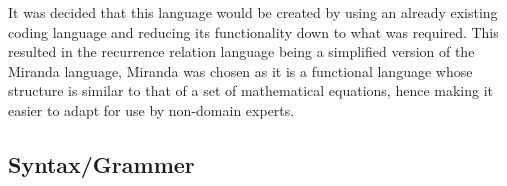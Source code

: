 \documentclass{article}
\begin{document}
It was decided that this language would be created by using an already existing coding language and reducing its functionality down to what was required. This resulted in the recurrence relation language being a simplified version of the Miranda language, Miranda was chosen as it is a functional language whose structure is similar to that of a set of mathematical equations, hence making it easier to adapt for use by non-domain experts.   

\subsection{Syntax/Grammer}


\end{document}
